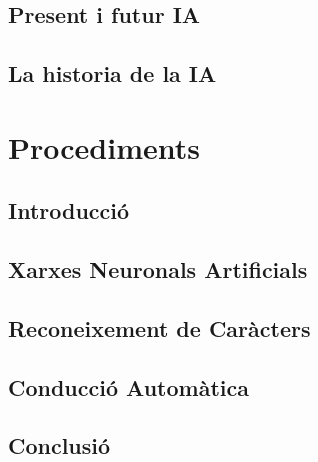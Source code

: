 \documentclass[a4paper,12pt]{report}
\begin{document}
\chapter{Present i futur IA}


\chapter{La historia de la IA}


\part{Procediments}

\chapter{Introducció}


\chapter{Xarxes Neuronals Artificials}


\chapter{Reconeixement de Caràcters}


\chapter{Conducció Automàtica}


\chapter{Conclusió}


\appendix


\printbibliography
\end{document}
